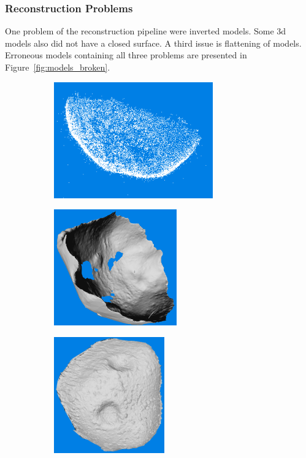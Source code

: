 \subsubsection{Reconstruction Problems} \label{sec:recon_problems}
One problem of the reconstruction pipeline were inverted models. Some \gls{3d} models also did not have a closed surface. A third issue is flattening of models. Erroneous models containing all three problems are presented in Figure~\ref{fig:models_broken}.
\begin{figure}[htb]
    \centering
        \begin{subfigure}[b]{0.32\textwidth}
            \centering
            \includegraphics[width=\textwidth,height=5cm]{doc/thesis/0_figures/models_quality/broken/broken_points1.png}
            \caption{} %
            \label{fig:models_broken_points}
        \end{subfigure}
        \begin{subfigure}[b]{0.32\textwidth}
            \centering
            \includegraphics[width=\textwidth,height=5cm]{doc/thesis/0_figures/models_quality/broken/broken_refine2.png}
            \caption{}
            \label{fig:models_broken_mesh}
        \end{subfigure}
        \begin{subfigure}[b]{0.32\textwidth}
            \centering
            \includegraphics[width=\textwidth,height=5cm]{doc/thesis/0_figures/models_quality/50_10/120_50_10_refine1.png}

\end{subfigure}
\end{figure}
